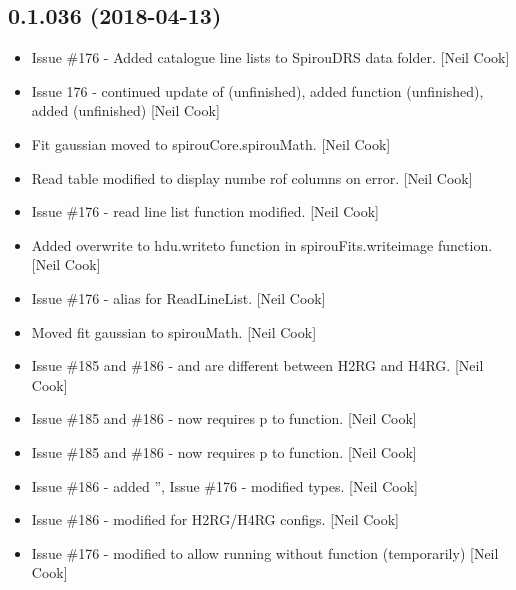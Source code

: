 \documentclass[a4paper,10pt,english]{report}
\begin{document}
\subsection{0.1.036 (2018-04-13)}
\label{\detokenize{misc/changelog:id462}}\begin{itemize}
\item {} 
Issue \#176 - Added catalogue line lists to SpirouDRS data folder.
{[}Neil Cook{]}

\item {} 
Issue 176 - continued update of  (unfinished),
added  function (unfinished), added 
(unfinished) {[}Neil Cook{]}

\item {} 
Fit gaussian moved to spirouCore.spirouMath. {[}Neil Cook{]}

\item {} 
Read table modified to display numbe rof columns on error. {[}Neil Cook{]}

\item {} 
Issue \#176 - read line list function modified. {[}Neil Cook{]}

\item {} 
Added overwrite to hdu.writeto function in spirouFits.writeimage
function. {[}Neil Cook{]}

\item {} 
Issue \#176 - alias for ReadLineList. {[}Neil Cook{]}

\item {} 
Moved fit gaussian to spirouMath. {[}Neil Cook{]}

\item {} 
Issue \#185 and \#186 -  and  are
different between H2RG and H4RG. {[}Neil Cook{]}

\item {} 
Issue \#185 and \#186 -  now requires p to function.
{[}Neil Cook{]}

\item {} 
Issue \#185 and \#186 -  now requires p to function.
{[}Neil Cook{]}

\item {} 
Issue \#186 - added ”, Issue \#176 - modified 
types. {[}Neil Cook{]}

\item {} 
Issue \#186 - modified  for H2RG/H4RG configs. {[}Neil Cook{]}

\item {} 
Issue \#176 - modified to allow running without function (temporarily)
{[}Neil Cook{]}

\end{itemize}
\end{document}
